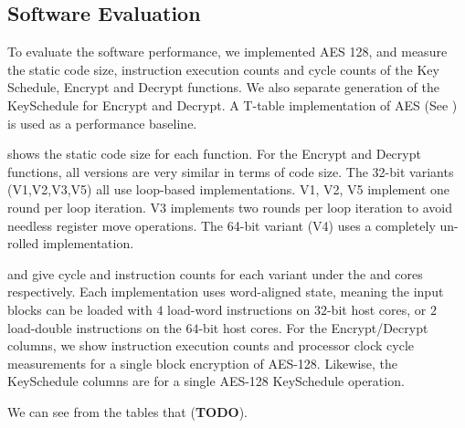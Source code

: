 
\subsection{Software Evaluation}
\label{sec:eval:sw}

To evaluate the software performance, we implemented AES 128, and
measure the static code size, instruction execution counts and cycle
counts of the Key Schedule, Encrypt and Decrypt functions.
We also separate generation of the KeySchedule for Encrypt and Decrypt.
A T-table implementation of AES (See )
is used as a performance baseline.

 shows the static code size for each
function.
For the Encrypt and Decrypt functions, all versions are very similar
in terms of code size.
The 32-bit variants (V1,V2,V3,V5) all use loop-based implementations.
V1, V2, V5 implement one round per loop iteration. V3 implements two
rounds per loop iteration to avoid needless register move operations.
The 64-bit variant (V4) uses a completely un-rolled implementation.

and
give cycle and instruction counts for each
variant under the  and  cores respectively.
Each implementation uses word-aligned state, meaning the input blocks
can be loaded with $4$ load-word instructions on $32$-bit host cores,
or $2$ load-double instructions on the $64$-bit host cores.
For the Encrypt/Decrypt columns, we show instruction execution counts
and processor clock cycle measurements for a single block
encryption of AES-128.
Likewise, the KeySchedule columns are for a single AES-128 KeySchedule
operation.


We can see from the tables that ({\bf TODO}).


%
%

